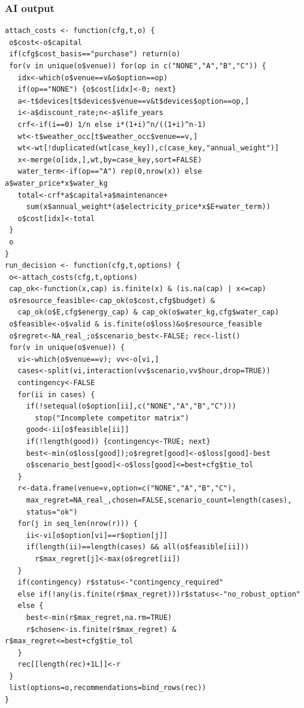 \subsubsection*{AI output}
\begin{lstlisting}[style=Rcode]
attach_costs <- function(cfg,t,o) {
 o$cost<-o$capital
 if(cfg$cost_basis=="purchase") return(o)
 for(v in unique(o$venue)) for(op in c("NONE","A","B","C")) {
   idx<-which(o$venue==v&o$option==op)
   if(op=="NONE") {o$cost[idx]<-0; next}
   a<-t$devices[t$devices$venue==v&t$devices$option==op,]
   i<-a$discount_rate;n<-a$life_years
   crf<-if(i==0) 1/n else i*(1+i)^n/((1+i)^n-1)
   wt<-t$weather_occ[t$weather_occ$venue==v,]
   wt<-wt[!duplicated(wt[case_key]),c(case_key,"annual_weight")]
   x<-merge(o[idx,],wt,by=case_key,sort=FALSE)
   water_term<-if(op=="A") rep(0,nrow(x)) else a$water_price*x$water_kg
   total<-crf*a$capital+a$maintenance+
     sum(x$annual_weight*(a$electricity_price*x$E+water_term))
   o$cost[idx]<-total
 }
 o
}
run_decision <- function(cfg,t,options) {
 o<-attach_costs(cfg,t,options)
 cap_ok<-function(x,cap) is.finite(x) & (is.na(cap) | x<=cap)
 o$resource_feasible<-cap_ok(o$cost,cfg$budget) &
   cap_ok(o$E,cfg$energy_cap) & cap_ok(o$water_kg,cfg$water_cap)
 o$feasible<-o$valid & is.finite(o$loss)&o$resource_feasible
 o$regret<-NA_real_;o$scenario_best<-FALSE; rec<-list()
 for(v in unique(o$venue)) {
   vi<-which(o$venue==v); vv<-o[vi,]
   cases<-split(vi,interaction(vv$scenario,vv$hour,drop=TRUE))
   contingency<-FALSE
   for(ii in cases) {
     if(!setequal(o$option[ii],c("NONE","A","B","C")))
       stop("Incomplete competitor matrix")
     good<-ii[o$feasible[ii]]
     if(!length(good)) {contingency<-TRUE; next}
     best<-min(o$loss[good]);o$regret[good]<-o$loss[good]-best
     o$scenario_best[good]<-o$loss[good]<=best+cfg$tie_tol
   }
   r<-data.frame(venue=v,option=c("NONE","A","B","C"),
     max_regret=NA_real_,chosen=FALSE,scenario_count=length(cases),
     status="ok")
   for(j in seq_len(nrow(r))) {
     ii<-vi[o$option[vi]==r$option[j]]
     if(length(ii)==length(cases) && all(o$feasible[ii]))
       r$max_regret[j]<-max(o$regret[ii])
   }
   if(contingency) r$status<-"contingency_required"
   else if(!any(is.finite(r$max_regret)))r$status<-"no_robust_option"
   else {
     best<-min(r$max_regret,na.rm=TRUE)
     r$chosen<-is.finite(r$max_regret) & r$max_regret<=best+cfg$tie_tol
   }
   rec[[length(rec)+1L]]<-r
 }
 list(options=o,recommendations=bind_rows(rec))
}
\end{lstlisting}
